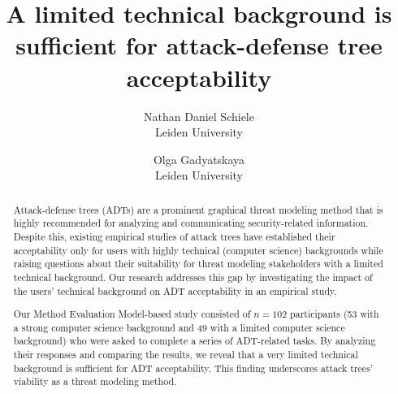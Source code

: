 \documentclass[letterpaper,twocolumn,10pt]{article}
\begin{document}
\title{\Large \bf A limited technical background is sufficient for attack-defense tree acceptability}

\author{
{\rm Nathan Daniel Schiele}\\
Leiden University
\and
{\rm Olga Gadyatskaya}\\
Leiden University
}

 
\maketitle
\begin{abstract}

Attack-defense trees (ADTs) are a prominent graphical threat modeling method that is highly recommended for analyzing and communicating security-related information. Despite this, existing empirical studies of attack trees have established their acceptability only for users with highly technical (computer science) backgrounds while raising questions about their suitability for threat modeling stakeholders with a limited technical background. Our research addresses this gap by investigating the impact of the users' technical background on ADT acceptability in an empirical study.

Our Method Evaluation Model-based study consisted of $n=102$ participants (53 with a strong computer science background and 49 with a limited computer science background) who were asked to complete a series of ADT-related tasks. By analyzing their responses and comparing the results, we reveal that a very limited technical background is sufficient for ADT acceptability. This finding underscores attack trees' viability as a threat modeling method. \end{abstract}
























\begin{small}
{}

\end{small}


\appendix


% 
\end{document}
